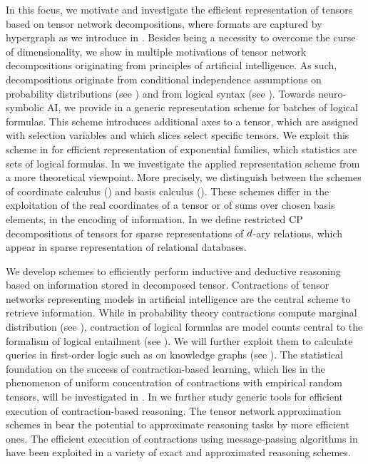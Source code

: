 \subsect{\focusonespec}
In this focus, we motivate and investigate the efficient representation of tensors based on tensor network decompositions, where formats are captured by hypergraph as we introduce in .
Besides being a necessity to overcome the curse of dimensionality, we show in  multiple motivations of tensor network decompositions originating from principles of artificial intelligence.
As such, decompositions originate from conditional independence assumptions on probability distributions (see ) and from logical syntax (see ).
Towards neuro-symbolic AI, we provide in  a generic representation scheme for batches of logical formulas.
This scheme introduces additional axes to a tensor, which are assigned with selection variables and which slices select specific tensors.
We exploit this scheme in  for efficient representation of exponential families, which statistics are sets of logical formulas.
In  we investigate the applied representation scheme from a more theoretical viewpoint.
More precisely, we distinguish between the schemes of coordinate calculus () and basis calculus ().
These schemes differ in the exploitation of the real coordinates of a tensor or of sums over chosen basis elements, in the encoding of information.
In  we define restricted $\mathrm{CP}$ decompositions of tensors for sparse representations of $d$-ary relations, which appear in sparse representation of relational databases.

\subsect{\focustwospec}
We develop schemes to efficiently perform inductive and deductive reasoning based on information stored in decomposed tensor.
Contractions of tensor networks representing models in artificial intelligence are the central scheme to retrieve information.
While in probability theory contractions compute marginal distribution (see ), contraction of logical formulas are model counts central to the formalism of logical entailment (see ).
We will further exploit them to calculate queries in first-order logic such as on knowledge graphs (see ). %
The statistical foundation on the success of contraction-based learning, which lies in the phenomenon of uniform concentration of contractions with empirical random tensors, will be investigated in .
In  we further study generic tools for efficient execution of contraction-based reasoning.
The tensor network approximation schemes in  bear the potential to approximate reasoning tasks by more efficient ones.
The efficient execution of contractions using message-passing algorithms in  have been exploited in a variety of exact and approximated reasoning schemes.

%
%
%
%
